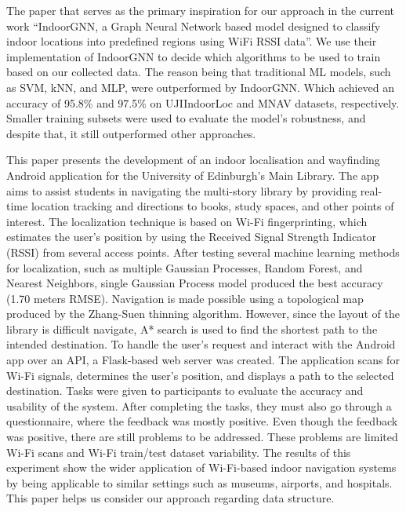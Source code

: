 \documentclass[conference]{IEEEtran}
\begin{document}
	The paper that serves as the primary inspiration \cite{LRE2} for our approach in the current work “IndoorGNN, a Graph Neural Network based model designed to classify indoor locations into predefined regions using WiFi RSSI data”. We use their implementation of IndoorGNN to decide which algorithms to be used to train based on our collected data. The reason being that traditional ML models, such as SVM, kNN, and MLP, were outperformed by IndoorGNN. Which achieved an accuracy of 95.8\% and 97.5\% on UJIIndoorLoc and MNAV datasets, respectively.  Smaller training subsets were used to evaluate the model's robustness, and despite that, it still outperformed other approaches.
	
	
	 This paper \cite{LRE3} presents the development of an indoor localisation and wayfinding Android application for the University of Edinburgh’s Main Library. The app aims to assist students in navigating the multi-story library by providing real-time location tracking and directions to books, study spaces, and other points of interest. The localization technique is based on Wi-Fi fingerprinting, which estimates the user's position by using the Received Signal Strength Indicator (RSSI) from several access points. After testing several machine learning methods for localization, such as multiple Gaussian Processes, Random Forest, and Nearest Neighbors, single Gaussian Process model produced the best accuracy (1.70 meters RMSE). Navigation is made possible using a topological map produced by the Zhang-Suen thinning algorithm. However, since the layout of the library is difficult navigate, A* search is used to find the shortest path to the intended destination.
	To handle the user's request and interact with the Android app over an API, a Flask-based web server was created. The application scans for Wi-Fi signals, determines the user’s position, and displays a path to the selected destination. Tasks were given to participants to evaluate the accuracy and usability of the system. After completing the tasks, they must also go through a questionnaire, where the feedback was mostly positive. Even though the feedback was positive, there are still problems to be addressed. These problems are limited Wi-Fi scans and Wi-Fi train/test dataset variability. The results of this experiment show the wider application of Wi-Fi-based indoor navigation systems by being applicable to similar settings such as museums, airports, and hospitals. This paper helps us consider our approach regarding data structure.
	
\end{document}
